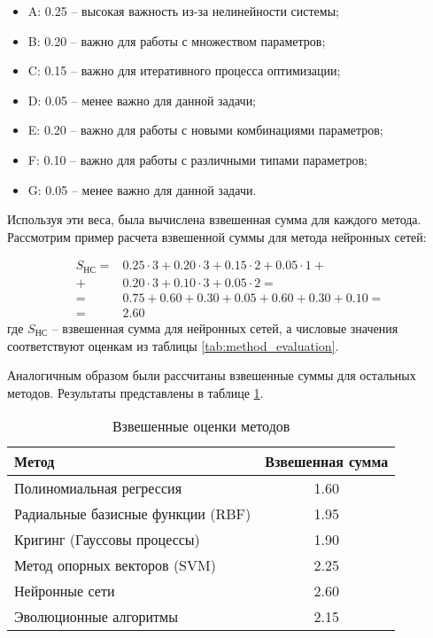 \begin{itemize}
    \item A: 0.25 -- высокая важность из-за нелинейности системы;
    \item B: 0.20 -- важно для работы с множеством параметров;
    \item C: 0.15 -- важно для итеративного процесса оптимизации;
    \item D: 0.05 -- менее важно для данной задачи;
    \item E: 0.20 -- важно для работы с новыми комбинациями параметров;
    \item F: 0.10 -- важно для работы с различными типами параметров;
    \item G: 0.05 -- менее важно для данной задачи.
\end{itemize}

Используя эти веса, была вычислена взвешенная сумма для каждого метода. Рассмотрим пример расчета взвешенной суммы для метода нейронных сетей:

\begin{equation}
    \begin{split}
        S_{НС} = & 0.25 \cdot 3 + 0.20 \cdot 3 + 0.15 \cdot 2 + 0.05 \cdot 1 + \\
        +        & 0.20 \cdot 3 + 0.10 \cdot 3 + 0.05 \cdot 2 =                \\
        =        & 0.75 + 0.60 + 0.30 + 0.05 + 0.60 + 0.30 + 0.10 =            \\
        =        & 2.60
    \end{split}
\end{equation}
где $S_{НС}$ -- взвешенная сумма для нейронных сетей, а числовые значения
соответствуют оценкам из таблицы \ref{tab:method_evaluation}.

Аналогичным образом были рассчитаны взвешенные суммы для остальных методов.
Результаты представлены в таблице \ref{tab:weighted_scores}.

\begin{table}[h]
    \centering
    \caption{Взвешенные оценки методов}
    \begin{tabular}{lc}
        \midrule
        Метод                             & Взвешенная сумма \\
        \midrule
        Полиномиальная регрессия          & 1.60             \\
        Радиальные базисные функции (RBF) & 1.95             \\
        Кригинг (Гауссовы процессы)       & 1.90             \\
        Метод опорных векторов (SVM)      & 2.25             \\
        Нейронные сети                    & 2.60             \\
        Эволюционные алгоритмы            & 2.15             \\
        \hline
    \end{tabular}
    \label{tab:weighted_scores}
\end{table}



